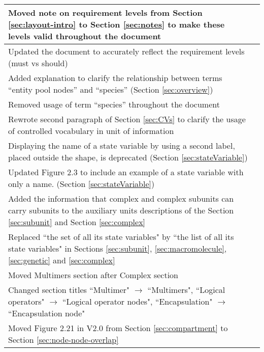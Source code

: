 \begin{center}
\label{tab:revision history 2.1}
\tablelasttail{\hline}
\begin{supertabular}{|p{12cm}|c|}\hline
Moved note on requirement levels from Section \ref{sec:layout-intro} to Section \ref{sec:notes} to make these levels valid throughout the document
& \\\hline Updated the document to accurately reflect the requirement levels (must vs should)
& \\\hline Added explanation to clarify the relationship between terms ``entity pool nodes'' and ``species'' (Section \ref{sec:overview})
& \\\hline Removed usage of term ``species'' throughout the document 
& \\\hline Rewrote second paragraph of Section \ref{sec:CVs} to clarify the usage of controlled vocabulary in unit of information 
& \\\hline Displaying the name of a state variable by using a second label, placed outside the shape, is deprecated (Section \ref{sec:stateVariable}) 
& \\\hline Updated Figure 2.3 to include an example of a state variable with only a name. (Section \ref{sec:stateVariable}) 
& \\\hline Added the information that complex and complex subunits can carry subunits to the auxiliary units descriptions of the Section \ref{sec:subunit} and  Section \ref{sec:complex} 
& \\\hline Replaced ``the set of all its state variables" by ``the list of all its state variables" in Sections \ref{sec:subunit}, \ref{sec:macromolecule}, \ref{sec:genetic} and \ref{sec:complex} 
& \\\hline Moved Multimers section after Complex section
& \\\hline Changed section titles ``Multimer" $\rightarrow$ ``Multimers", ``Logical operators" $\rightarrow$ ``Logical operator nodes", ``Encapsulation" $\rightarrow$ ``Encapsulation node" 
& \\\hline Moved Figure 2.21 in V2.0 from Section \ref{sec:compartment} to Section \ref{sec:node-node-overlap}

\end{supertabular}
\end{center}
